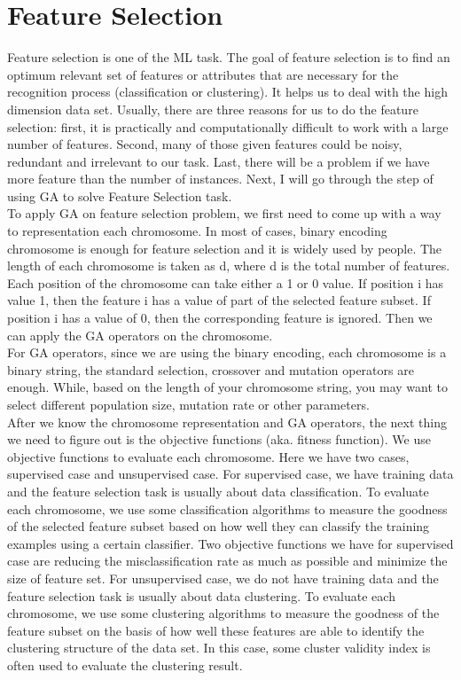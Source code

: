 \documentclass{article}
\begin{document}
\section{Feature Selection}
Feature selection is one of the ML task. The goal of feature selection is to find an optimum relevant set of features or attributes that are necessary for the recognition process (classification or clustering). It helps us to deal with the high dimension data set. Usually, there are three reasons for us to do the feature selection: first, it is practically and computationally difficult to work with a large number of features. Second, many of those given features could be noisy, redundant and irrelevant to our task. Last, there will be a problem if we have more feature than the number of instances. Next, I will go through the step of using GA to solve Feature Selection task. \cite{survey1} \\

To apply GA on feature selection problem, we first need to come up with a way to representation each chromosome. In most of cases, binary encoding chromosome is enough for feature selection and it is widely used by people. The length of each chromosome is taken as d, where d is the total number of features. Each position of the chromosome can take either a 1 or 0 value. If position i has value 1, then the feature i has a value of part of the selected feature subset. If position i has a value of 0, then the corresponding feature is ignored. Then we can apply the GA operators on the chromosome. \\

For GA operators, since we are using the binary encoding, each chromosome is a binary string, the standard selection, crossover and mutation operators are enough. While, based on the length of your chromosome string, you may want to select different population size, mutation rate or other parameters. \\

After we know the chromosome representation and GA operators, the next thing we need to figure out is the objective functions (aka. fitness function). We use objective functions to evaluate each chromosome. Here we have two cases, supervised case and unsupervised case. For supervised case, we have training data and the feature selection task is usually about data classification. To evaluate each chromosome, we use some classification algorithms to measure the goodness of the selected feature subset based on how well they can classify the training examples using a certain classifier. Two objective functions we have for supervised case are reducing the misclassification rate as much as possible and minimize the size of feature set. For unsupervised case, we do not have training data and the feature selection task is usually about data clustering. To evaluate each chromosome, we use some clustering algorithms to measure the goodness of the feature subset on the basis of how well these features are able to identify the clustering structure of the data set. In this case, some cluster validity index is often used to evaluate the clustering result.
\end{document}
